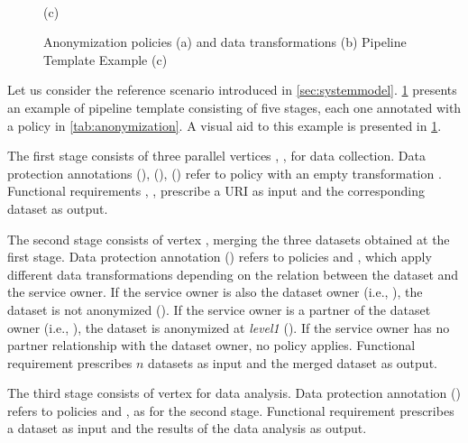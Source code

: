 \begin{figure}[ht!]
{
  }
  \\
  \footnotesize(c)
  \caption{Anonymization policies (a) and data transformations (b) Pipeline Template Example (c)}\label{tab:anonymization}
  \label{fig:service_composition_template}
\end{figure}

\begin{example}[\bf \pipelineTemplate]\label{ex:template}
  Let us consider the reference scenario introduced in \cref{sec:systemmodel}.
  \cref{fig:service_composition_template} presents an example of pipeline template consisting of five stages, each one annotated with a policy in \cref{tab:anonymization}.
  {\color{OurColor}A visual aid to this example is presented in \cref{fig:service_composition_template}}.

  The first stage consists of three parallel vertices , ,  for data collection.
  Data protection annotations \myLambda(), \myLambda(), \myLambda() refer to policy  with an empty transformation .
  Functional requirements , ,   prescribe a URI as input and the corresponding dataset as output.

  The second stage consists of vertex , merging the three datasets obtained at the first stage. Data protection annotation \myLambda() refers to policies  and , which apply different data transformations depending on the relation between the dataset and the service owner.
  If the service owner is also the dataset owner (i.e., \pone), the dataset is not anonymized (). If the service owner is a partner of the dataset owner (i.e., \ptwo), the dataset is anonymized at \emph{level1} (). If the service owner has no partner relationship with the dataset owner, no policy applies.
  Functional requirement  prescribes $n$ datasets as input and the merged dataset as output.

  The third stage consists of vertex   for data analysis.
  Data protection annotation \myLambda() refers to policies  and , as for the second stage.
  Functional requirement  prescribes a dataset as input and the results of the data analysis as output.


\end{example}
